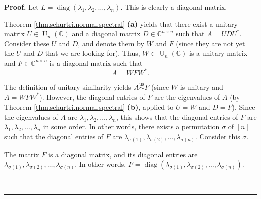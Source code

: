 \documentclass[numbers=enddot,12pt,final,onecolumn,notitlepage]{scrartcl}%
\numberwithin{exer}{subsection}
\theoremstyle{definition}
\newenvironment{proof}[1][Proof]{\noindent\textbf{#1.} }{\ \rule{0.5em}{0.5em}}
\begin{document}
\begin{proof}
Let $L=\operatorname*{diag}\left(  \lambda_{1},\lambda_{2},\ldots,\lambda
_{n}\right)  $. This is clearly a diagonal matrix.

Theorem \ref{thm.schurtri.normal.spectral} \textbf{(a)} yields that there
exist a unitary matrix $U\in\operatorname*{U}\nolimits_{n}\left(
\mathbb{C}\right)  $ and a diagonal matrix $D\in\mathbb{C}^{n\times n}$ such
that $A=UDU^{\ast}$. Consider these $U$ and $D$, and denote them by $W$ and
$F$ (since they are not yet the $U$ and $D$ that we are looking for). Thus,
$W\in\operatorname*{U}\nolimits_{n}\left(  \mathbb{C}\right)  $ is a unitary
matrix and $F\in\mathbb{C}^{n\times n}$ is a diagonal matrix such that%
\[
A=WFW^{\ast}.
\]


The definition of unitary similarity yields $A\overset{\operatorname*{us}%
}{\sim}F$ (since $W$ is unitary and $A=WFW^{\ast}$). However, the diagonal
entries of $F$ are the eigenvalues of $A$ (by Theorem
\ref{thm.schurtri.normal.spectral} \textbf{(b)}, applied to $U=W$ and $D=F$).
Since the eigenvalues of $A$ are $\lambda_{1},\lambda_{2},\ldots,\lambda_{n}$,
this shows that the diagonal entries of $F$ are $\lambda_{1},\lambda
_{2},\ldots,\lambda_{n}$ in some order. In other words, there exists a
permutation $\sigma$ of $\left[  n\right]  $ such that the diagonal entries of
$F$ are $\lambda_{\sigma\left(  1\right)  },\lambda_{\sigma\left(  2\right)
},\ldots,\lambda_{\sigma\left(  n\right)  }$. Consider this $\sigma$.

The matrix $F$ is a diagonal matrix, and its diagonal entries are
$\lambda_{\sigma\left(  1\right)  },\lambda_{\sigma\left(  2\right)  }%
,\ldots,\lambda_{\sigma\left(  n\right)  }$. In other words,
$F=\operatorname*{diag}\left(  \lambda_{\sigma\left(  1\right)  }%
,\lambda_{\sigma\left(  2\right)  },\ldots,\lambda_{\sigma\left(  n\right)
}\right)  $.


\end{proof}
\end{document}
